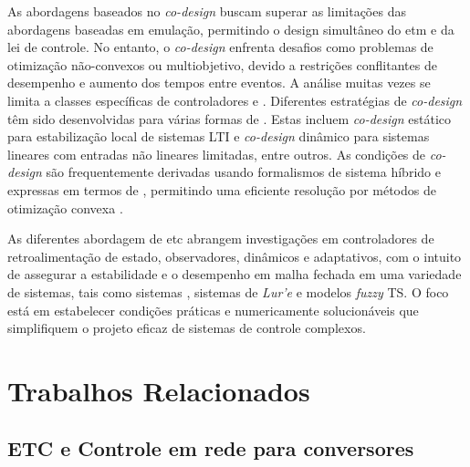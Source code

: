 As abordagens baseados no \textit{co-design} buscam superar as limitações das abordagens baseadas em emulação, permitindo o design simultâneo do \acrshort{etm} e da lei de controle. No entanto, o \textit{co-design} enfrenta desafios como problemas de otimização não-convexos ou multiobjetivo, devido a restrições conflitantes de desempenho e aumento dos tempos entre eventos. A análise muitas vezes se limita a classes específicas de controladores e  \cite{coutinho2021}. Diferentes estratégias de \textit{co-design} têm sido desenvolvidas para várias formas de . Estas incluem \textit{co-design} estático para estabilização local de sistemas LTI e \textit{co-design} dinâmico para sistemas lineares com entradas não lineares limitadas, entre outros. As condições de \textit{co-design} são frequentemente derivadas usando formalismos de sistema híbrido e expressas em termos de , permitindo uma eficiente resolução por métodos de otimização convexa \cite{coutinho2021}.

As diferentes abordagem de \acrshort{etc} abrangem investigações em controladores de retroalimentação de estado, observadores,  dinâmicos e adaptativos, com o intuito de assegurar a estabilidade e o desempenho em malha fechada em uma variedade de sistemas, tais como sistemas , sistemas de \textit{Lur'e} e modelos \textit{fuzzy} TS. O foco está em estabelecer condições práticas e numericamente solucionáveis que simplifiquem o projeto eficaz de sistemas de controle complexos.

\section{Trabalhos Relacionados}
\subsection{ETC e Controle em rede para conversores}